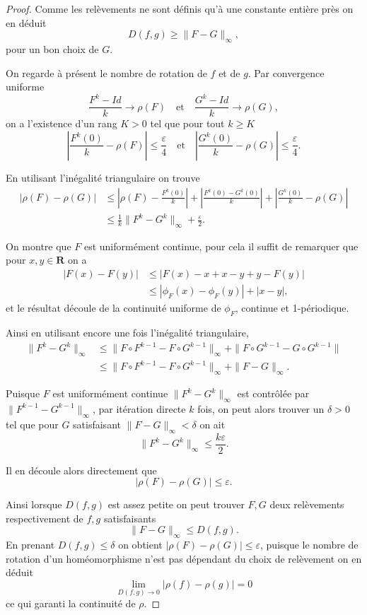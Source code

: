 \documentclass[12pt]{article}
\newcommand{\R}{\mathbf{R}}
\theoremstyle{remark}
\begin{document}
\begin{proof}
        Comme les relèvements ne sont définis qu'à une constante entière près on en déduit \[
                D(f,g) \ge \|F-G\|_{\infty}
        ,\] pour un bon choix de $G$.

        On regarde à présent le nombre de rotation de $f$ et de $g$. Par convergence uniforme \[
                \frac{F^{k}-Id}{k} \to \rho(F) \quad \text{et} \quad \frac{G^{k}-Id}{k} \to \rho(G) 
        ,\] on a l'existence d'un rang $K > 0$ tel que pour tout $k \ge K$ \[
        |\frac{F^{k}(0)}{k} - \rho(F)| \le \frac{\varepsilon}{4} \quad \text{et} \quad |\frac{G^{k}(0)}{k} - \rho(G)| \le \frac{\varepsilon}{4} 
        .\] 

        En utilisant l'inégalité triangulaire on trouve
        \begin{align*}
                |\rho(F)-\rho(G)| &\le |\rho(F) - \frac{F^{k}(0)}{k}| + |\frac{F^{k}(0)-G^{k}(0)}{k}| + |\frac{G^{k}(0)}{k} - \rho(G)| \\
                                  &\le \frac{1}{k}\|F^{k}-G^{k}\|_{\infty} + \frac{\varepsilon}{2}
        .\end{align*}

        On montre que $F$ est uniformément continue, pour cela il suffit de remarquer que pour $x, y \in \R$ on a 
        \begin{align*}
                |F(x)-F(y)| &\le |F(x)-x+x-y+y-F(y)| \\
                            &\le |\phi_{F}(x) - \phi_{F}(y)| + |x-y|
        ,\end{align*} et le résultat découle de la continuité uniforme de $\phi_{F}$, continue et 1-périodique.

        Ainsi en utilisant encore une fois l'inégalité triangulaire,
        \begin{align*}
                \|F^{k}-G^{k}\|_{\infty} &\le \|F\circ F^{k-1} - F\circ G^{k-1}\|_{\infty} + \|F\circ G^{k-1} - G\circ G^{k-1}\| \\
                                         &\le \|F\circ F^{k-1} - F\circ G^{k-1}\|_{\infty} + \|F-G\|_{\infty} 
        .\end{align*}

        Puisque $F$ est uniformément continue $\|F^{k}-G^{k}\|_{\infty}$ est contrôlée par $\|F^{k-1}-G^{k-1}\|_{\infty}$, par itération directe $k$ fois, on peut alors trouver un $\delta > 0$ tel que pour $G$ satisfaisant $\|F-G\|_{\infty} < \delta$ on ait \[
                \|F^{k}-G^{k}\|_{\infty} \le \frac{k\varepsilon}{2}
        .\] 

        Il en découle alors directement que \[
                |\rho(F)-\rho(G)| \le \varepsilon
        .\]

        Ainsi lorsque $D(f,g)$ est assez petite on peut trouver $F, G$ deux relèvements respectivement de  $f, g$ satisfaisants  \[
                \|F-G\|_{\infty} \le D(f, g)
        .\] En prenant $D(f,g) \le \delta$ on obtient $|\rho(F)-\rho(G)| \le \varepsilon$, puisque le nombre de rotation d'un homéomorphisme n'est pas dépendant du choix de relèvement on en déduit 
        \[
                \lim_{D(f,g)\to 0}|\rho(f)-\rho(g)| = 0
        \]  ce qui garanti la continuité de $\rho$.
\end{proof}
\end{document}
